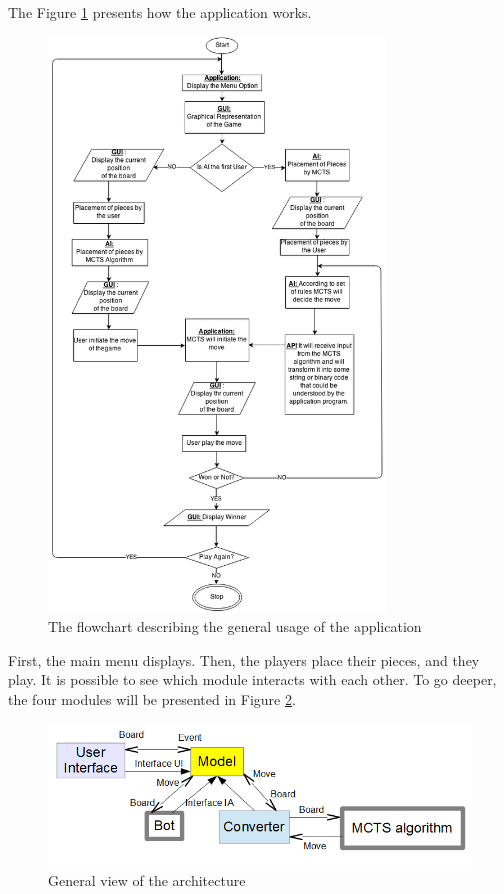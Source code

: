 The Figure \ref{fig:dAI} presents how the application works.
\newpage
\begin{figure}[H]
	\centering
	\includegraphics[width=0.80\textwidth]{2General_Architecture/2.1.2GeneralView/api.png}
	\caption{The flowchart describing the general usage of the application}
	\label{fig:dAI}
\end{figure}
\thispagestyle{empty}

First, the main menu displays. Then, the players place their pieces, and they play. It is possible to see which module interacts with each other. To go deeper, the four modules will be presented in Figure \ref{fig:gra}.

\begin{figure}[!h]
\centering
\includegraphics[width=1\textwidth]{2General_Architecture/2.1.2GeneralView/prep.png}
\caption{General view of the architecture}
\label{fig:gra}
\end{figure}

